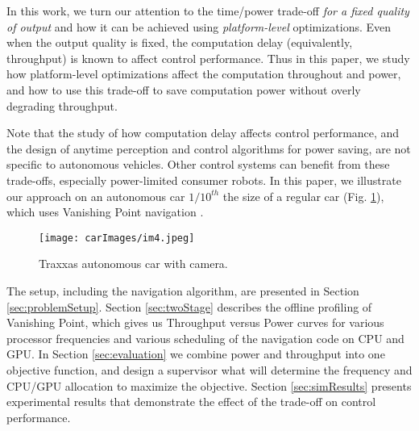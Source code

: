 In this work, we turn our attention to the time/power trade-off \emph{for a fixed quality of output} and how it can be achieved using \emph{platform-level} optimizations.
Even when the output quality is fixed, the computation delay (equivalently, throughput) is known to affect control performance. 
Thus in this paper, we study how platform-level optimizations affect the computation throughout and power, and how to use this trade-off to save computation power without overly degrading throughput.

Note that the study of how computation delay affects control performance, and the design of anytime perception and control algorithms for power saving, are not specific to autonomous vehicles.
Other control systems can benefit from these trade-offs, especially power-limited consumer robots.
In this paper, we illustrate our approach on an autonomous car $1/10^{th}$ the size of a regular car (Fig. \ref{fig:traxxas}), which uses Vanishing Point navigation \cite{VP1}.
\begin{figure}[t]
	\centering
	\texttt{[image: carImages/im4.jpeg]}
	\caption{Traxxas autonomous car with camera.}
		\label{fig:traxxas}
\end{figure}  
The setup, including the navigation algorithm, are presented in Section \ref{sec:problemSetup}.
Section \ref{sec:twoStage} describes the offline profiling of Vanishing Point, which gives us Throughput versus Power curves for various processor frequencies and various scheduling of the navigation code on CPU and GPU.
In Section \ref{sec:evaluation} we combine power and throughput into one objective function, and design a supervisor what will determine the frequency and CPU/GPU allocation to maximize the objective.
Section \ref{sec:simResults} presents experimental results that demonstrate the effect of the trade-off on control performance.
%
%
%
